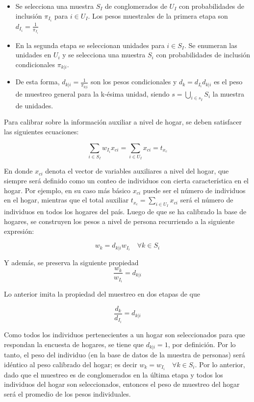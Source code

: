 \documentclass[
  10pt,
  spanish,
]{book}
\providecommand{\tightlist}{%
  \setlength{\itemsep}{0pt}\setlength{\parskip}{0pt}}
\begin{document}
\begin{itemize}
\tightlist
\item
  Se selecciona una muestra \(S_I\) de conglomerados de \(U_I\) con probabilidades de inclusión \(\pi_{I_i}\) para \(i\in U_I\). Los pesos muestrales de la primera etapa son \(d_{I_i} = \frac{1}{\pi_{I_i}}\)
\item
  En la segunda etapa se seleccionan unidades para \(i\in S_I\). Se enumeran las unidades en \(U_i\) y se selecciona una muestra \(S_i\) con probabilidades de inclusión condicionales \(\pi_{k|i}\).
\item
  De esta forma, \(d_{k|i} = \frac{1}{\pi_{k|i}}\) son los pesos condicionales y \(d_k = d_{I_i}d_{k|i}\) es el peso de muestreo general para la k-ésima unidad, siendo \(s =\bigcup_{i\in s_I}S_i\) la muestra de unidades.
\end{itemize}

Para calibrar sobre la información auxiliar a nivel de hogar, se deben satisfacer las siguientes ecuaciones:

\[
\sum_{i \in S_I}w_{I_i}x_{ci} = \sum_{i \in U_I}x_{ci} = t_{x_c}
\]

En donde \(x_{ci}\) denota el vector de variables auxiliares a nivel del hogar, que siempre será definido como un conteo de individuos con cierta característica en el hogar. Por ejemplo, en su caso más básico \(x_{ci}\) puede ser el número de individuos en el hogar, mientras que el total auxiliar \(t_{x_c} = \sum_{i \in U_I}x_{ci}\) será el número de individuos en todos los hogares del país. Luego de que se ha calibrado la base de hogares, se construyen los pesos a nivel de persona recurriendo a la siguiente expresión:

\[
w_k = d_{k|i}w_{I_i} \quad \forall k \in S_i
\]

Y además, se preserva la siguiente propiedad
\[
\frac{w_k}{w_{I_i}}=d_{k|i}
\]

Lo anterior imita la propiedad del muestreo en dos etapas de que

\[
\frac{d_k}{d_{I_i}}=d_{k|i}
\]

Como todos los individuos pertenecientes a un hogar son seleccionados para que respondan la encuesta de hogares, se tiene que \(d_{k|i} = 1\), por definición. Por lo tanto, el peso del individuo (en la base de datos de la muestra de personas) será idéntico al peso calibrado del hogar; es decir \(w_k = w_{I_i} \quad \forall k \in S_i\). Por lo anterior, dado que el muestreo es de conglomerados en la última etapa y todos los individuos del hogar son seleccionados, entonces el peso de muestreo del hogar será el promedio de los pesos individuales.
\end{document}
